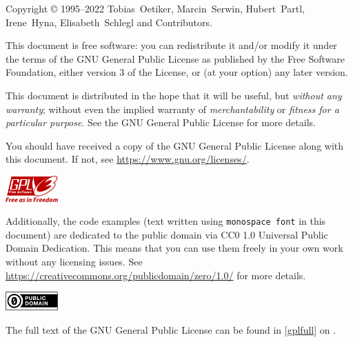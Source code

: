 \begin{small}
  \noindent Copyright \copyright{} 1995--2022 Tobias~Oetiker, Marcin~Serwin,
  Hubert~Partl, Irene~Hyna, Elisabeth~Schlegl and Contributors.

  This document is free software: you can redistribute it and/or modify it under
  the terms of the GNU General Public License as published by the Free Software
  Foundation, either version 3 of the License, or (at your option) any later
  version.

  This document is distributed in the hope that it will be useful, but
  \emph{without any warranty}; without even the implied warranty of
  \emph{merchantability} or \emph{fitness for a particular purpose}.  See
  the GNU General Public License for more details.

  You should have received a copy of the GNU General Public License along with
  this document.  If not, see \url{https://www.gnu.org/licenses/}.
  \vspace{-5pt}
  \begin{flushright}
    \href{https://www.gnu.org/licenses/gpl-3.0.html}{%
      \includegraphics[width=2cm]{images/gpl3.pdf}}\hspace*{10pt}
  \end{flushright}

  \bigskip\noindent
  Additionally, the code examples (text written using \texttt{monospace font}
  in this document) are dedicated to the public domain via CC0 1.0 Universal
  Public Domain Dedication. This means that you can use them freely in your own
  work without any licensing issues. See
  \url{https://creativecommons.org/publicdomain/zero/1.0/} for more details.
  \vspace{-5pt}
  \begin{flushright}
    \href{https://creativecommons.org/publicdomain/zero/1.0/}{%
      \includegraphics[width=2cm]{images/cc-zero.pdf}}\hspace*{10pt}
  \end{flushright}

  \noindent The full text of the GNU General Public License can be found in
  \autoref{gplfull} on .
\end{small}

